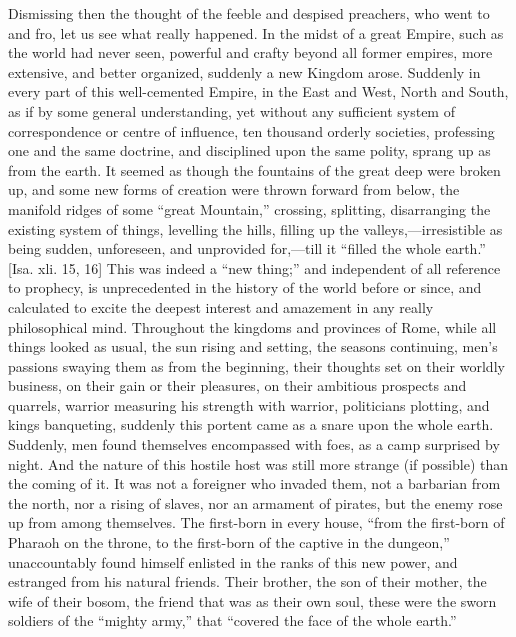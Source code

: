 Dismissing then the thought of the feeble and despised preachers, who
went to and fro, let us see what really happened. In the midst of a
great Empire, such as the world had never seen, powerful and crafty
beyond all former empires, more extensive, and better organized,
suddenly a new Kingdom arose. Suddenly in every part of this
well-cemented Empire, in the East and West, North and South, as if by
some general understanding, yet without any sufficient system of
correspondence or centre of influence, ten thousand orderly societies,
professing one and the same doctrine, and disciplined upon the same
polity, sprang up as from the earth. It seemed as though the fountains
of the great deep were broken up, and some new forms of creation were
thrown forward from below, the manifold ridges of some ``great
Mountain,'' crossing, splitting, disarranging the existing system of
things, levelling the hills, filling up the valleys,—irresistible as
being sudden, unforeseen, and unprovided for,—till it ``filled the
whole earth.'' [Isa. xli. 15, 16] This was indeed a ``new
thing;'' and independent of all reference to prophecy, is
unprecedented in the history of the world before or since, and
calculated to excite the deepest interest and amazement in any really
philosophical mind. Throughout the kingdoms and provinces of Rome, while
all things looked as usual, the sun rising and setting, the seasons
continuing, men's passions swaying them as from the beginning, their
thoughts set on their worldly business, on their gain or their
pleasures, on their ambitious prospects and quarrels, warrior measuring
his strength with warrior, politicians plotting, and kings banqueting,
suddenly this portent came as a snare upon the whole earth. Suddenly,
men found themselves encompassed with foes, as a camp surprised by
night. And the nature of this hostile host was still more strange (if
possible) than the coming of it. It was not a foreigner who invaded
them, not a barbarian from the north, nor a rising of slaves, nor an
armament of pirates, but the enemy rose up from among themselves. The
first-born in every house, ``from the first-born of Pharaoh on the
throne, to the first-born of the captive in the dungeon,''
unaccountably found himself enlisted in the ranks of this new power, and
estranged from his natural friends. Their brother, the son of their
mother, the wife of their bosom, the friend that was as their own soul,
these were the sworn soldiers of the ``mighty army,'' that
``covered the face of the whole earth.''

